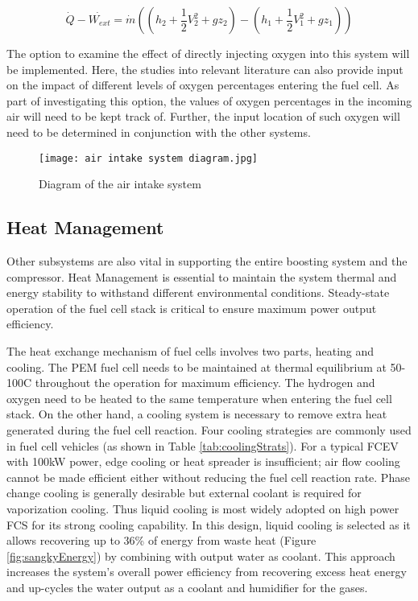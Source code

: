 \documentclass[a4paper,11pt]{article}
\begin{document}
\begin{equation}\label{eq:Steady_Flow_Enegy_Equation}
        \dot{Q}-\dot{W_{ext}}=\dot{m}((h_{2}+\frac{1}{2}V_{2}^{2}+gz_{2})-(h_{1}+\frac{1}{2}V_{1}^{2}+gz_{1}))
\end{equation}

The option to examine the effect of directly injecting oxygen into this system will be implemented. Here, the studies into relevant literature can also provide input on the impact of different levels of oxygen percentages entering the fuel cell. As part of investigating this option, the values of oxygen percentages in the incoming air will need to be kept track of. Further, the input location of such oxygen will need to be determined in conjunction with the other systems.  

\begin{figure}[h]
    \texttt{[image: air intake system diagram.jpg]}
    \caption{Diagram of the air intake system}
    \centering
    \label{fig:airIntakeSys}  
\end{figure}


\subsection{Heat Management}

Other subsystems are also vital in supporting the entire boosting system and the compressor. Heat Management is essential to maintain the system thermal and energy stability to withstand different environmental conditions. Steady-state operation of the fuel cell stack is critical to ensure maximum power output efficiency.  

The heat exchange mechanism of fuel cells involves two parts, heating and cooling. The PEM fuel cell needs to be maintained at thermal equilibrium at 50-100\degree C throughout the operation for maximum efficiency. The hydrogen and oxygen need to be heated to the same temperature when entering the fuel cell stack. On the other hand, a cooling system is necessary to remove extra heat generated during the fuel cell reaction. Four cooling strategies are commonly used in fuel cell vehicles (as shown in Table \ref{tab:coolingStrats}). For a typical FCEV with 100kW power, edge cooling or heat spreader is insufficient; air flow cooling cannot be made efficient either without reducing the fuel cell reaction rate\cite{wenthermalmanagement}. Phase change cooling is generally desirable but external coolant is required for vaporization cooling. Thus liquid cooling is most widely adopted on high power FCS for its strong cooling capability\cite{nguyen2020proton}.  In this design, liquid cooling is selected as it allows recovering up to 36\% of energy from waste heat (Figure \ref{fig:sangkyEnergy}) by combining with output water as coolant. This approach increases the system's overall power efficiency from recovering excess heat energy and up-cycles the water output as a coolant and humidifier for the gases. 
\end{document}
